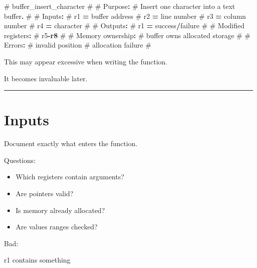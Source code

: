\documentclass[
  oneside,
  openany]{book}
\newenvironment{Shaded}{\begin{snugshade}}{\end{snugshade}}
\newcommand{\KeywordTok}[1]{\textcolor[rgb]{0.13,0.29,0.53}{\textbf{#1}}}
\newcommand{\NormalTok}[1]{#1}
\newcommand{\OperatorTok}[1]{\textcolor[rgb]{0.81,0.36,0.00}{\textbf{#1}}}
\providecommand{\tightlist}{%
  \setlength{\itemsep}{0pt}\setlength{\parskip}{0pt}}
\begin{document}
\begin{Shaded}
\begin{Highlighting}[]
\NormalTok{\# buffer\_insert\_character}
\NormalTok{\#}
\NormalTok{\# Purpose}\OperatorTok{:}
\NormalTok{\#     Insert one character into a text buffer}\OperatorTok{.}
\NormalTok{\#}
\NormalTok{\# Inputs}\OperatorTok{:}
\NormalTok{\#     r1 }\OperatorTok{=}\NormalTok{ buffer address}
\NormalTok{\#     r2 }\OperatorTok{=}\NormalTok{ line number}
\NormalTok{\#     r3 }\OperatorTok{=}\NormalTok{ column number}
\NormalTok{\#     r4 }\OperatorTok{=}\NormalTok{ character}
\NormalTok{\#}
\NormalTok{\# Outputs}\OperatorTok{:}
\NormalTok{\#     r1 }\OperatorTok{=}\NormalTok{ success}\OperatorTok{/}\NormalTok{failure}
\NormalTok{\#}
\NormalTok{\# Modified registers}\OperatorTok{:}
\NormalTok{\#     r5}\OperatorTok{{-}}\KeywordTok{r8}
\NormalTok{\#}
\NormalTok{\# Memory ownership}\OperatorTok{:}
\NormalTok{\#     buffer owns allocated storage}
\NormalTok{\#}
\NormalTok{\# Errors}\OperatorTok{:}
\NormalTok{\#     invalid position}
\NormalTok{\#     allocation failure}
\NormalTok{\#}
\end{Highlighting}
\end{Shaded}

This may appear excessive when writing the function.

It becomes invaluable later.

\begin{center}\rule{0.5\linewidth}{0.5pt}\end{center}

\hypertarget{inputs}{%
\section{Inputs}\label{inputs}}

Document exactly what enters the function.

Questions:

\begin{itemize}
\tightlist
\item
  Which registers contain arguments?
\item
  Are pointers valid?
\item
  Is memory already allocated?
\item
  Are values ranges checked?
\end{itemize}

Bad:

\begin{Shaded}
\begin{Highlighting}[]
\NormalTok{r1 contains something}
\end{Highlighting}
\end{Shaded}
\end{document}
